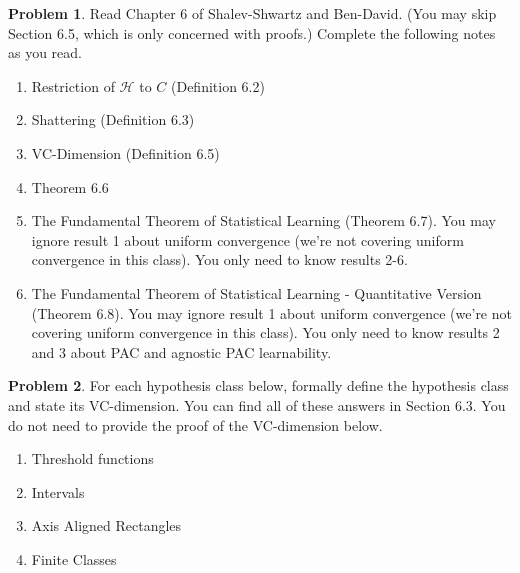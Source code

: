 \documentclass[10pt]{article}
\theoremstyle{definition}
\newtheorem{problem}{Problem}
\begin{document}
\newpage
\begin{problem}
    Read Chapter 6 of Shalev-Shwartz and Ben-David.
    (You may skip Section 6.5, which is only concerned with proofs.)
    Complete the following notes as you read.
    \begin{enumerate}
        \item Restriction of $\mathcal H$ to $C$ (Definition 6.2)
            \vspace{4in}
        \item Shattering (Definition 6.3)
            \vspace{4in}
        \item VC-Dimension (Definition 6.5)
            \vspace{4.5in}
        \item Theorem 6.6
            \vspace{4.5in}
        \item The Fundamental Theorem of Statistical Learning (Theorem 6.7).
            You may ignore result 1 about uniform convergence
            (we're not covering uniform convergence in this class).
            You only need to know results 2-6.
            \vspace{4in}
        \item The Fundamental Theorem of Statistical Learning - Quantitative Version (Theorem 6.8).
            You may ignore result 1 about uniform convergence
            (we're not covering uniform convergence in this class).
            You only need to know results 2 and 3 about PAC and agnostic PAC learnability.
            \vspace{4in}
    \end{enumerate}
\end{problem}

\newpage
\begin{problem}
    For each hypothesis class below,
    formally define the hypothesis class and state its VC-dimension.
    You can find all of these answers in Section 6.3.
    You do not need to provide the proof of the VC-dimension below.
    \begin{enumerate}
        \item Threshold functions
            \vspace{4.5in}
        \item Intervals
            \vspace{4.5in}
        \item Axis Aligned Rectangles
            \vspace{4.5in}
        \item Finite Classes
            \vspace{4.5in}
    \end{enumerate}
\end{problem}
\end{document}
